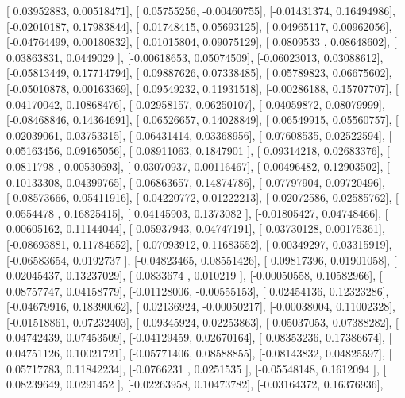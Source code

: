 \documentclass{article}
\begin{document}
       [ 0.03952883,  0.00518471],
       [ 0.05755256, -0.00460755],
       [-0.01431374,  0.16494986],
       [-0.02010187,  0.17983844],
       [ 0.01748415,  0.05693125],
       [ 0.04965117,  0.00962056],
       [-0.04764499,  0.00180832],
       [ 0.01015804,  0.09075129],
       [ 0.0809533 ,  0.08648602],
       [ 0.03863831,  0.0449029 ],
       [-0.00618653,  0.05074509],
       [-0.06023013,  0.03088612],
       [-0.05813449,  0.17714794],
       [ 0.09887626,  0.07338485],
       [ 0.05789823,  0.06675602],
       [-0.05010878,  0.00163369],
       [ 0.09549232,  0.11931518],
       [-0.00286188,  0.15707707],
       [ 0.04170042,  0.10868476],
       [-0.02958157,  0.06250107],
       [ 0.04059872,  0.08079999],
       [-0.08468846,  0.14364691],
       [ 0.06526657,  0.14028849],
       [ 0.06549915,  0.05560757],
       [ 0.02039061,  0.03753315],
       [-0.06431414,  0.03368956],
       [ 0.07608535,  0.02522594],
       [ 0.05163456,  0.09165056],
       [ 0.08911063,  0.1847901 ],
       [ 0.09314218,  0.02683376],
       [ 0.0811798 ,  0.00530693],
       [-0.03070937,  0.00116467],
       [-0.00496482,  0.12903502],
       [ 0.10133308,  0.04399765],
       [-0.06863657,  0.14874786],
       [-0.07797904,  0.09720496],
       [-0.08573666,  0.05411916],
       [ 0.04220772,  0.01222213],
       [ 0.02072586,  0.02585762],
       [ 0.0554478 ,  0.16825415],
       [ 0.04145903,  0.1373082 ],
       [-0.01805427,  0.04748466],
       [ 0.00605162,  0.11144044],
       [-0.05937943,  0.04747191],
       [ 0.03730128,  0.00175361],
       [-0.08693881,  0.11784652],
       [ 0.07093912,  0.11683552],
       [ 0.00349297,  0.03315919],
       [-0.06583654,  0.0192737 ],
       [-0.04823465,  0.08551426],
       [ 0.09817396,  0.01901058],
       [ 0.02045437,  0.13237029],
       [ 0.0833674 ,  0.010219  ],
       [-0.00050558,  0.10582966],
       [ 0.08757747,  0.04158779],
       [-0.01128006, -0.00555153],
       [ 0.02454136,  0.12323286],
       [-0.04679916,  0.18390062],
       [ 0.02136924, -0.00050217],
       [-0.00038004,  0.11002328],
       [-0.01518861,  0.07232403],
       [ 0.09345924,  0.02253863],
       [ 0.05037053,  0.07388282],
       [ 0.04742439,  0.07453509],
       [-0.04129459,  0.02670164],
       [ 0.08353236,  0.17386674],
       [ 0.04751126,  0.10021721],
       [-0.05771406,  0.08588855],
       [-0.08143832,  0.04825597],
       [ 0.05717783,  0.11842234],
       [-0.0766231 ,  0.0251535 ],
       [-0.05548148,  0.1612094 ],
       [ 0.08239649,  0.0291452 ],
       [-0.02263958,  0.10473782],
       [-0.03164372,  0.16376936],
\end{document}
